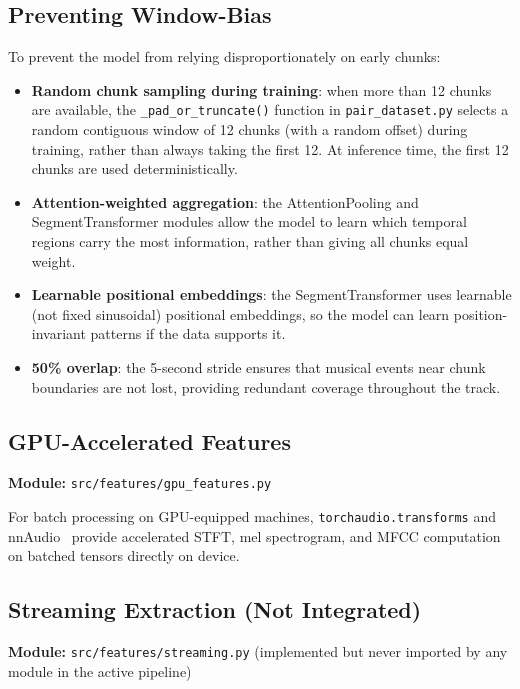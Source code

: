 \documentclass[11pt,a4paper]{article}
\begin{document}
\subsection{Preventing Window-Bias}

To prevent the model from relying disproportionately on early chunks:

\begin{itemize}[nosep]
  \item \textbf{Random chunk sampling during training}: when more than 12 chunks are available, the \texttt{\_pad\_or\_truncate()} function in \texttt{pair\_dataset.py} selects a random contiguous window of 12 chunks (with a random offset) during training, rather than always taking the first 12. At inference time, the first 12 chunks are used deterministically.
  \item \textbf{Attention-weighted aggregation}: the AttentionPooling and SegmentTransformer modules allow the model to learn which temporal regions carry the most information, rather than giving all chunks equal weight.
  \item \textbf{Learnable positional embeddings}: the SegmentTransformer uses learnable (not fixed sinusoidal) positional embeddings, so the model can learn position-invariant patterns if the data supports it.
  \item \textbf{50\% overlap}: the 5-second stride ensures that musical events near chunk boundaries are not lost, providing redundant coverage throughout the track.
\end{itemize}

\subsection{GPU-Accelerated Features}

\textbf{Module:} \texttt{src/features/gpu\_features.py}

For batch processing on GPU-equipped machines, \texttt{torchaudio.transforms} and nnAudio~\cite{C4} provide accelerated STFT, mel spectrogram, and MFCC computation on batched tensors directly on device.

\subsection{Streaming Extraction (Not Integrated)}

\textbf{Module:} \texttt{src/features/streaming.py} (implemented but never imported by any module in the active pipeline)
\end{document}
